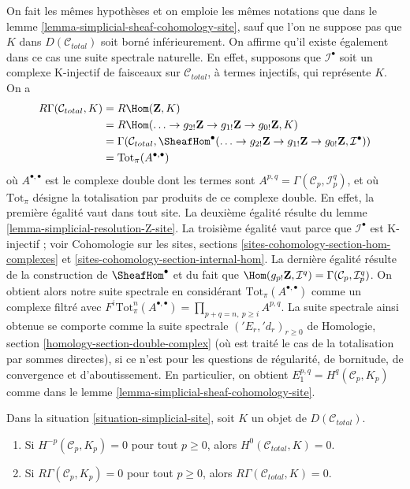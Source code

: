 \begin{remark}
\label{remark-simplicial-cohomology-site}
On fait les mêmes hypothèses et on emploie les mêmes notations que dans le
lemme \ref{lemma-simplicial-sheaf-cohomology-site},
sauf que l'on ne suppose pas que $K$ dans $D(\mathcal{C}_{total})$
soit borné inférieurement. On affirme qu'il existe également dans ce cas une
suite spectrale naturelle. En effet, supposons que
$\mathcal{I}^\bullet$ soit un complexe K-injectif de faisceaux sur
$\mathcal{C}_{total}$, à termes injectifs, qui représente $K$.
On a
\begin{align*}
R\Gamma(\mathcal{C}_{total}, K)
& =
R\Hom(\mathbf{Z}, K) \\
& =
R\Hom(
\ldots \to g_{2!}\mathbf{Z} \to g_{1!}\mathbf{Z} \to g_{0!}\mathbf{Z}, K) \\
& =
\Gamma(\mathcal{C}_{total},
\SheafHom^\bullet(
\ldots \to g_{2!}\mathbf{Z} \to g_{1!}\mathbf{Z} \to g_{0!}\mathbf{Z},
\mathcal{I}^\bullet)) \\
& =
\text{Tot}_\pi(A^{\bullet, \bullet})
\end{align*}
où $A^{\bullet, \bullet}$ est le complexe double dont les termes sont
$A^{p, q} = \Gamma(\mathcal{C}_p, \mathcal{I}^q_p)$, et où $\text{Tot}_\pi$
désigne la totalisation par produits de ce complexe double.
En effet, la première égalité vaut dans tout site. La deuxième égalité
résulte du lemme \ref{lemma-simplicial-resolution-Z-site}.
La troisième égalité vaut parce que $\mathcal{I}^\bullet$ est K-injectif ; voir
Cohomologie sur les sites, sections \ref{sites-cohomology-section-hom-complexes}
et \ref{sites-cohomology-section-internal-hom}.
La dernière égalité résulte de la construction de $\SheafHom^\bullet$
et du fait que $\Hom(g_{p!}\mathbf{Z}, \mathcal{I}^q) =
\Gamma(\mathcal{C}_p, \mathcal{I}^q_p)$.
On obtient alors notre suite spectrale en considérant
$\text{Tot}_\pi(A^{\bullet, \bullet})$ comme un
complexe filtré avec $F^i\text{Tot}^n_\pi(A^{\bullet, \bullet}) =
\prod_{p + q = n,\ p \geq i} A^{p, q}$. La suite spectrale
ainsi obtenue se comporte comme la suite spectrale $({}'E_r, {}'d_r)_{r \geq 0}$ de
Homologie, section \ref{homology-section-double-complex}
(où est traité le cas de la totalisation par sommes directes),
si ce n'est pour les questions de régularité, de bornitude, de convergence et
d'aboutissement. En particulier, on obtient $E_1^{p, q} = H^q(\mathcal{C}_p, K_p)$
comme dans le lemme \ref{lemma-simplicial-sheaf-cohomology-site}.
\end{remark}

\begin{lemma}
\label{lemma-simplicial-sheaf-cohomology-site-zero}
Dans la situation \ref{situation-simplicial-site}, soit $K$ un objet de
$D(\mathcal{C}_{total})$.
\begin{enumerate}
\item Si $H^{-p}(\mathcal{C}_p, K_p) = 0$ pour tout $p \geq 0$, alors
$H^0(\mathcal{C}_{total}, K) = 0$.
\item Si $R\Gamma(\mathcal{C}_p, K_p) = 0$
pour tout $p \geq 0$, alors $R\Gamma(\mathcal{C}_{total}, K) = 0$.
\end{enumerate}
\end{lemma}

